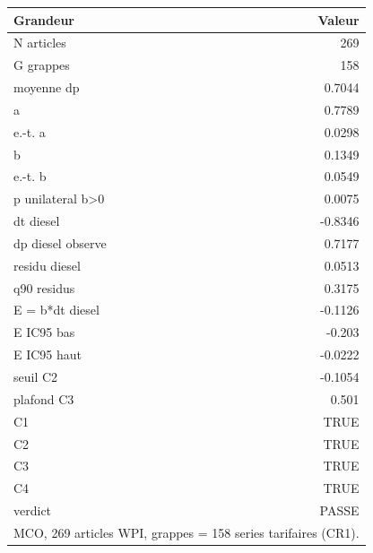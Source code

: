 \begin{tabular}{lr}
\toprule
Grandeur & Valeur \\
\midrule
N articles & 269 \\
G grappes & 158 \\
moyenne dp & 0.7044 \\
a & 0.7789 \\
e.-t. a & 0.0298 \\
b & 0.1349 \\
e.-t. b & 0.0549 \\
p unilateral b>0 & 0.0075 \\
dt diesel & -0.8346 \\
dp diesel observe & 0.7177 \\
residu diesel & 0.0513 \\
q90 residus & 0.3175 \\
E = b*dt diesel & -0.1126 \\
E IC95 bas & -0.203 \\
E IC95 haut & -0.0222 \\
seuil C2 & -0.1054 \\
plafond C3 & 0.501 \\
C1 & TRUE \\
C2 & TRUE \\
C3 & TRUE \\
C4 & TRUE \\
verdict & PASSE \\
\bottomrule
\multicolumn{2}{l}{\footnotesize MCO, 269 articles WPI, grappes = 158 series tarifaires (CR1).} \\
\end{tabular}
